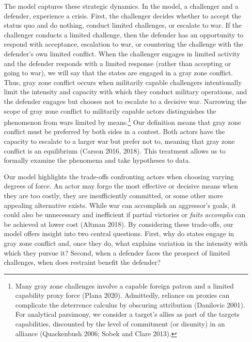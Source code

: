 \documentclass[
]{article}
\begin{document}
The model captures these strategic dynamics. In the model, a challenger and a defender, experience a crisis. First, the challenger decides whether to accept the status quo and do nothing, conduct limited challenges, or escalate to war. If the challenger conducts a limited challenge, then the defender has an opportunity to respond with acceptance, escalation to war, or countering the challenge with the defender's own limited conflict. When the challenger engages in limited activity and the defender responds with a limited response (rather than accepting or going to war), we will say that the states are engaged in a gray zone conflict. Thus, gray zone conflict occurs when militarily capable challengers intentionally limit the intensity and capacity with which they conduct military operations, and the defender engages but chooses not to escalate to a decisive war. Narrowing the scope of gray zone conflict to militarily capable actors distinguishes the phenomenon from wars limited by means.\footnote{Many gray zone challenges involve a capable foreign patron and a limited capability proxy force (Plana 2020). Admittedly, reliance on proxies can complicate the deterrence calculus by obscuring attribution (Danilovic 2001). For analytical parsimony, we consider a target's allies as part of the targets capabilities, discounted by the level of commitment (or disunity) in an alliance (Quackenbush 2006; Sobek and Clare 2013).} Our definition means that gray zone conflict must be preferred by both sides in a contest. Both actors have the capacity to escalate to a larger war but prefer not to, meaning that gray zone conflict is an equilibrium (Carson 2016, 2018). This treatment allows us to formally examine the phenomena and take hypotheses to data.

Our model highlights the trade-offs confronting actors when choosing varying degrees of force. An actor may forgo the most effective or decisive means when they are too costly, they are insufficiently committed, or some other more appealing alternative exists. While war can accomplish an aggressor's goals, it could also be unnecessary and inefficient if partial victories or \emph{faits accomplis} can be achieved at lower cost (Altman 2018). By considering these trade-offs, our model offers insight into two central questions. First, why do states engage in gray zone conflict and, once they do, what explains variation in the intensity with which they pursue it? Second, when a defender faces the prospect of limited challenges, when does restraint benefit the defender?
\end{document}
